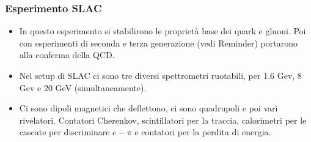 \subsubsection{Esperimento SLAC}
\begin{itemize}
    \item In questo esperimento si stabilirono le proprietà base dei quark e gluoni. Poi con esperimenti di seconda e terza generazione (vedi Reminder) portarono alla conferma della QCD.
    \item Nel setup di SLAC ci sono tre diversi spettrometri ruotabili, per 1.6 Gev, 8 Gev e 20 GeV (simultaneamente).
    \item Ci sono dipoli magnetici che deflettono, ci sono quadrupoli e poi vari rivelatori. Contatori Cherenkov, scintillatori per la traccia, calorimetri per le cascate per discriminare $e-\pi$ e contatori per la perdita di energia.
\end{itemize}
